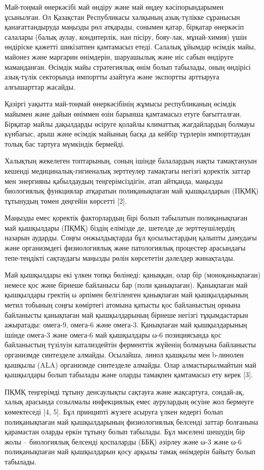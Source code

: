 Май-тоңмай өнеркәсібі май өндіру және май өңдеу кәсіпорындарымен
ұсынылған. Ол Қазақстан Республикасы халқының азық-түлікке сұранысын
қанағаттандыруда маңызды рөл атқарады, сонымен қатар, бірқатар өнеркәсіп
салалары (балық аулау, кондитерлік, нан пісіру, бояу-лак, мұнай-химия)
үшін өндіріске қажетті шикізатпен қамтамасыз етеді. Салалық ұйымдар
өсімдік майы, майонез және маргарин өнімдерін, шаруашылық және иіс сабын
өндіруге маманданған. Өсімдік майы стратегиялық өнім болып табылады,
оның өндірісі азық-түлік секторында импортты азайтуға және экспортты
арттыруға алғышарттар жасайды.

Қазіргі уақытта май-тоңмай өнеркәсібінің жұмысы республиканың өсімдік
майымен және дайын өніммен өзін барынша қамтамасыз етуге бағытталған.
Бірқатар майлы дақылдарды өсіруге қолайлы климаттық жағдайлардың болмауы
күнбағыс, арыш және өсімдік майының басқа да кейбір түрлерін
импорттаудан толық бас тартуға мүмкіндік бермейді.

Халықтың жекелеген топтарының, соның ішінде балалардың нақты тамақтануын
кешенді медициналық-гигиеналық зерттеулер тамақтағы негізгі қоректік
заттар мен энергияны қабылдаудың теңгерімсіздігін, атап айтқанда,
маңызды биологиялық функциялар атқаратын полиқанықпаған май қышқылдарын
(ПҚМҚ) тұтынудың төмен деңгейін көрсетті {[}2{]}.

Маңызды емес қоректік факторлардың бірі болып табылатын полиқанықпаған
май қышқылдары (ПҚМҚ) біздің елімізде де, шетелде де зерттеушілердің
назарын аударды. Соңғы онжылдықтарда бұл қосылыстардың қалыпты дамудағы
және организмдегі физиологиялық және патологиялық процестер арасындағы
тепе-теңдікті сақтаудағы маңызды рөлін көрсететін дәлелдер жинақталды.

Май қышқылдары екі үлкен топқа бөлінеді: қаныққан, олар бір
(моноқанықпаған) немесе қос және бірнеше байланысы бар (поли
қанықпаған). Қанықпаған май қышқылдары гректің ω әрпімен белгіленген
қанықпаған май қышқылдарының метил тобының соңғы көміртегі атомына
қатысты қос байланыстың орнына байланысты қанықпаған май қышқылдарының
бірнеше негізгі тұқымдастарын ажыратады: омега-9, омега-6 және омега-3.
Қанықпаған май қышқылдарының ішінде омега-3 және омега-6 май қышқылдары
ω-6 позициясында қос байланыстың түзілуін катализдейтін ферменттік
жүйенің болмауына байланысты организмде синтезделе алмайды. Осылайша,
линол қышқылы мен b-линолен қышқылы (ALA) организмде синтезделе алмайды.
Олар алмастырылмайтын май қышқылдары болып табылады және оларды тамақпен
қамтамасыз ету керек {[}3{]}.

ПҚМҚ теңгерімді тұтыну денсаулықты сақтауға және жақсартуға, сондай-ақ,
халық арасында созылмалы инфекциялық емес аурулардың өсуіне жол бермеуге
көмектеседі {[}4, 5{]}. Бұл принципті жүзеге асыруға үлкен кедергі болып
полиқанықпаған май қышқылдарының физиологиялық белсенді заттар болғанына
қарамастан оларды еркін тұтыну болып табылады. Бұл мәселені шешудің бір
жолы -- биологиялық белсенді қоспаларды (ББҚ) әзірлеу және ω-3 және ω-6
полиқанықпаған май қышқылдарын қосу арқылы тамақ өнімдерін байыту болып
табылады.

